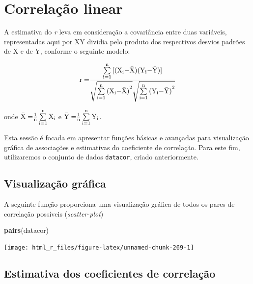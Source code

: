 \documentclass[
]{book}
\newenvironment{Shaded}{\begin{snugshade}}{\end{snugshade}}
\newcommand{\KeywordTok}[1]{\textcolor[rgb]{0.13,0.29,0.53}{\textbf{#1}}}
\newcommand{\NormalTok}[1]{#1}
\begin{document}
\hypertarget{correlauxe7uxe3o-linear}{%
\section{Correlação linear}\label{correlauxe7uxe3o-linear}}

A estimativa do \emph{r} leva em consideração a covariância entre duas variáveis, representadas aqui por XY dividia pelo produto dos respectivos desvios padrões de X e de Y, conforme o seguinte modelo:

\[
{\rm{r  =  }}\frac{{\sum\limits_{{\rm{i = 1}}}^{\rm{n}} {{\rm{[ (}}{{\rm{X}}_{\rm{i}}}{\rm{ - \bar X)(}}{{\rm{Y}}_{\rm{i}}}{\rm{ - \bar Y)] }}} }}{{\sqrt {\sum\limits_{{\rm{i = 1}}}^{\rm{n}} {{{{\rm{(}}{{\rm{X}}_{\rm{i}}}{\rm{ - \bar X)}}}^{\rm{2}}}} } \sqrt {\sum\limits_{{\rm{i = 1}}}^{\rm{n}} {{{{\rm{(}}{{\rm{Y}}_{\rm{i}}}{\rm{ - \bar Y)}}}^{\rm{2}}}} } }}
\]

onde \({\rm{\bar X = }}\frac{{\rm{1}}}{{\rm{n}}}\sum\limits_{{\rm{i = 1}}}^{\rm{n}} {{{\rm{X}}_{\rm{i}}}}\) e \({\rm{\bar Y = }}\frac{{\rm{1}}}{{\rm{n}}}\sum\limits_{{\rm{i = 1}}}^{\rm{n}} {{{\rm{Y}}_{\rm{i}}}}\).

Esta sessão é focada em apresentar funções básicas e avançadas para visualização gráfica de associações e estimativas do coeficiente de correlação. Para este fim, utilizaremos o conjunto de dados \texttt{datacor}, criado anteriormente.

\hypertarget{visualizauxe7uxe3o-gruxe1fica}{%
\subsection{Visualização gráfica}\label{visualizauxe7uxe3o-gruxe1fica}}

A seguinte função proporciona uma visualização gráfica de todos os pares de correlação possíveis (\emph{scatter-plot})

\begin{Shaded}
\begin{Highlighting}[]
\KeywordTok{pairs}\NormalTok{(datacor)}
\end{Highlighting}
\end{Shaded}

\begin{center}\texttt{[image: html\_r\_files/figure-latex/unnamed-chunk-269-1]} \end{center}

\hypertarget{estimativa-dos-coeficientes-de-correlauxe7uxe3o}{%
\subsection{Estimativa dos coeficientes de correlação}\label{estimativa-dos-coeficientes-de-correlauxe7uxe3o}}
\end{document}
